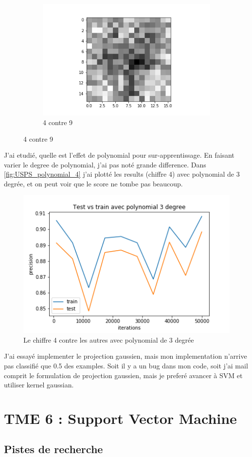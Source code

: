 \documentclass[a4paper,12pt]{article}
\begin{document}
\begin{figure}[h!]
\begin{subfigure}{.33\textwidth}
  \centering
	\includegraphics[width=\linewidth]{images/tme4/weight_w49.png}
	\caption{4 contre 9}
\end{subfigure}
\end{figure}

J'ai etudié, quelle est l'effet de polynomial pour sur-apprentissage. En faisant varier le degree de polynomial,
j'ai pas noté grande difference. Dans \autoref{fig:USPS_polynomial_4} j'ai plotté les results
 (chiffre 4)  avec polynomial de 3 degrée, et on peut voir que le score ne tombe pas beaucoup.

\begin{figure}[h!]
\caption{Le chiffre 4 contre les autres avec polynomial de 3 degrée}
\label{fig:USPS_polynomial_4}
\includegraphics[width=0.5\linewidth]{images/tme4/USPS_polynomial_4.png}
\centering
\end{figure}%

J'ai essayé implementer le projection gaussien, mais mon implementation n'arrive pas classifié que 0.5 des examples.
Soit il y a un bug dans mon code, soit j'ai mail comprit le formulation de projection gaussien, mais je preferé avancer à
SVM et utiliser kernel gaussian.

\section{TME 6 : Support Vector Machine}


\subsection{Pistes de recherche}



\end{document}
